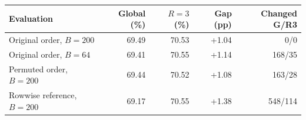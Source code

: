 \begin{tabular}{lrrrr}
\toprule
Evaluation & Global (\%) & $R=3$ (\%) & Gap (pp) & Changed G/R3 \\
\midrule
Original order, $B=200$ & 69.49 & 70.53 & +1.04 & 0/0 \\
Original order, $B=64$ & 69.41 & 70.55 & +1.14 & 168/35 \\
Permuted order, $B=200$ & 69.44 & 70.52 & +1.08 & 163/28 \\
Rowwise reference, $B=200$ & 69.17 & 70.55 & +1.38 & 548/114 \\
\bottomrule
\end{tabular}
